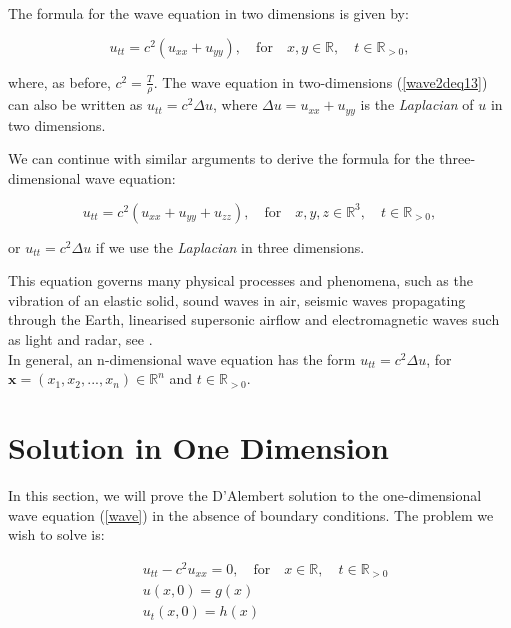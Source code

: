 \documentclass[a4paper, 12pt]{article}
\numberwithin{equation}{section}
\begin{document}
The formula for the wave equation in two dimensions is given by:

\begin{equation} \label{wave2deq13}
    u_{tt}=c^2(u_{xx}+u_{yy}), \quad \textrm{for} \quad x,y \in \mathbb{R}, \quad t \in \mathbb{R}_{>0},
\end{equation}

where, as before, $c^2=\frac{T}{\rho}$. The wave equation in two-dimensions
(\ref{wave2deq13}) can also be written as $u_{tt}=c^2\Delta u$, where $\Delta
u=u_{xx}+u_{yy}$ is the \emph{Laplacian} of $u$ in two dimensions.

We can continue with similar arguments to derive the formula for the
three-dimensional wave equation:

\begin {equation} \label{wave3deq14}
    u_{tt}=c^2(u_{xx}+u_{yy}+u_{zz}), \quad \textrm{for}\quad x,y,z \in \mathbb{R}^3, \quad t \in \mathbb{R}_{>0},
\end{equation}

or $u_{tt}=c^2 \Delta u$ if we use the \emph{Laplacian} in three dimensions.

This equation governs many physical processes and phenomena, such as the
vibration of an elastic solid, sound waves in air, seismic waves propagating
through the Earth, linearised supersonic airflow and electromagnetic waves such
as light and radar, see \cite[Ch. 1, Ex. 3]{Str}.
\\

In general, an n-dimensional wave equation has the form $u_{tt}=c^2 \Delta u$,
for $\boldsymbol{x}=(x_1, x_2, ..., x_n) \in \mathbb{R}^n$ and $t \in \mathbb{R}_{>0}$.

\section{Solution in One Dimension}
In this section, we will prove the D'Alembert solution to the one-dimensional
wave equation (\ref{wave}) in the absence of boundary conditions. The problem we
wish to solve is:

\begin{equation} \label{ivp1d}
    \begin{aligned}
    &u_{tt}-c^2u_{xx}=0, \quad \textrm{for} \quad x\in \mathbb{R},\quad t\in \mathbb{R}_{>0}\\
    &u(x,0)=g(x)\\
    &u_t(x,0)=h(x)
    \end{aligned}
\end{equation}
\end{document}

